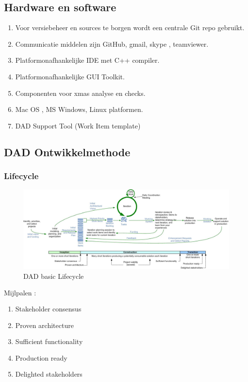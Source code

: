 \subsection{Hardware en software}
\begin{enumerate}
	\item Voor versiebeheer en sources te borgen wordt een centrale Git repo gebruikt.
	\item Communicatie middelen zijn GitHub, gmail, skype , teamviewer.
	\item Platformonafhankelijke IDE met C++ compiler.
	\item Platformonafhankelijke GUI Toolkit.
	\item Componenten voor xmas analyse en checks.
	\item Mac OS , MS Windows, Linux platformen.
	\item DAD Support Tool (Work Item template)
\end{enumerate}


\subsection{DAD Ontwikkelmethode}
\subsubsection{Lifecycle}

\begin{figure}[h]
  \includegraphics[width=1.0\textwidth]{dadLifecycleUP2}
  \caption{DAD basic Lifecycle} 
\end{figure}
Mijlpalen : 
\begin{enumerate}
\item Stakeholder consensus
\item Proven architecture
\item Sufficient functionality
\item Production ready
\item Delighted stakeholders
\end{enumerate}

